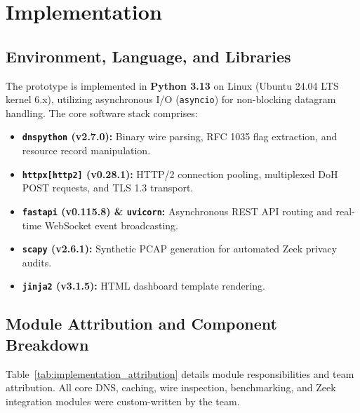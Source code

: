 \documentclass[10pt,a4paper]{article}
\begin{document}
\section{Implementation}

\subsection{Environment, Language, and Libraries}
The prototype is implemented in \textbf{Python 3.13} on Linux (Ubuntu 24.04 LTS kernel 6.x), utilizing asynchronous I/O (\texttt{asyncio}) for non-blocking datagram handling. The core software stack comprises:
\begin{itemize}\itemsep 1pt
    \item \textbf{\texttt{dnspython} (v2.7.0):} Binary wire parsing, RFC 1035 flag extraction, and resource record manipulation.
    \item \textbf{\texttt{httpx[http2]} (v0.28.1):} HTTP/2 connection pooling, multiplexed DoH POST requests, and TLS 1.3 transport.
    \item \textbf{\texttt{fastapi} (v0.115.8) \& \texttt{uvicorn}:} Asynchronous REST API routing and real-time WebSocket event broadcasting.
    \item \textbf{\texttt{scapy} (v2.6.1):} Synthetic PCAP generation for automated Zeek privacy audits.
    \item \textbf{\texttt{jinja2} (v3.1.5):} HTML dashboard template rendering.
\end{itemize}

\subsection{Module Attribution and Component Breakdown}
Table~\ref{tab:implementation_attribution} details module responsibilities and team attribution. All core DNS, caching, wire inspection, benchmarking, and Zeek integration modules were custom-written by the team.
\end{document}
